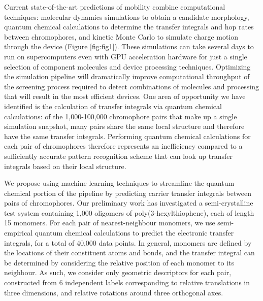 \documentclass[12pt]{article}
\begin{document}
Current state-of-the-art predictions of mobility combine computational techniques: molecular dynamics simulations to obtain a candidate morphology, quantum chemical calculations to determine the transfer integrals and hop rates between chromophores, and kinetic Monte Carlo to simulate charge motion through the device (Figure \ref{fig:fig1})\cite{MorphCT,Jones2016,Jones2017}.
These simulations can take several days to run on supercomputers even with GPU acceleration hardware for just a single selection of component molecules and device processing techniques.
Optimizing the simulation pipeline will dramatically improve computational throughput of the screening process required to detect combinations of molecules and processing that will result in the most efficient devices.
One area of opportunity we have identified is the calculation of transfer integrals via quantum chemical calculations: of the 1,000-100,000 chromophore pairs that make up a single simulation snapshot, many pairs share the same local structure and therefore have the same transfer integrals.
Performing quantum chemical calculations for each pair of chromophores therefore represents an inefficiency compared to a sufficiently accurate pattern recognition scheme that can look up transfer integrals based on their local structure.

We propose using machine learning techniques to streamline the quantum chemical portion of the pipeline by predicting carrier transfer integrals between pairs of chromophores.
Our preliminary work has investigated a semi-crystalline test system containing 1,000 oligomers of poly(3-hexylthiophene), each of length 15 monomers.
For each pair of nearest-neighbour monomers, we use semi-empirical quantum chemical calculations to predict the electronic transfer integrals, for a total of 40,000 data points.
In general, monomers are defined by the locations of their constituent atoms and bonds, and the transfer integral can be determined by considering the relative position of each monomer to its neighbour.
As such, we consider only geometric descriptors for each pair, constructed from 6 independent labels corresponding to relative translations in three dimensions, and relative rotations around three orthogonal axes.
\end{document}
